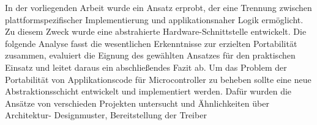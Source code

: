 
In der vorliegenden Arbeit wurde ein Ansatz erprobt, der eine Trennung zwischen plattformspezifischer Implementierung und applikationsnaher Logik ermöglicht. 
Zu diesem Zweck wurde eine abstrahierte Hardware-Schnittstelle entwickelt. 
Die folgende Analyse fasst die wesentlichen Erkenntnisse zur erzielten Portabilität zusammen, evaluiert die Eignung des gewählten Ansatzes für den praktischen Einsatz und leitet daraus ein abschließendes Fazit ab.
Um das Problem der Portabilität von Applikationscode für Microcontroller zu beheben sollte eine neue Abstraktionsschicht entwickelt und implementiert werden.
Dafür wurden die Ansätze von verschieden Projekten untersucht und Ähnlichkeiten über Architektur- Designmuster, Bereitstellung der Treiber 